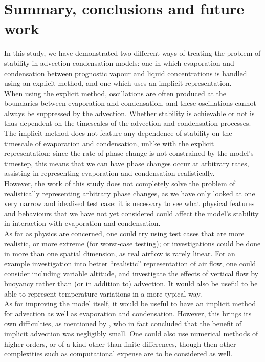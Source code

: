 \documentclass[11pt]{article}
\begin{document}
\section{Summary, conclusions and future work}
In this study, we have demonstrated two different ways of treating the problem of stability in advection-condensation models: one in which evaporation and condensation between prognostic vapour and liquid concentrations is handled using an explicit method, and one which uses an implicit representation. \\
When using the explicit method, oscillations are often produced at the boundaries between evaporation and condensation, and these oscillations cannot always be suppressed by the advection. Whether stability is achievable or not is thus dependent on the timescales of the advection and condensation processes. \\
The implicit method does not feature any dependence of stability on the timescale of evaporation and condensation, unlike with the explicit representation: since the rate of phase change is not constrained by the model's timestep, this means that we can have phase changes occur at arbitrary rates, assisting in representing evaporation and condensation realistically. \\
However, the work of this study does not completely solve the problem of realistically representing arbitrary phase changes, as we have only looked at one very narrow and idealised test case: it is necessary to see what physical features and behaviours that we have not yet considered could affect the model's stability in interaction with evaporation and condensation. \\
As far as physics are concerned, one could try using test cases that are more realistic, or more extreme (for worst-case testing); or investigations could be done in more than one spatial dimension, as real airflow is rarely linear. For an example investigation into better ``realistic'' representation of air flow, one could consider including variable altitude, and investigate the effects of vertical flow by buoyancy rather than (or in addition to) advection. It would also be useful to be able to represent temperature variations in a more typical way. \\
As for improving the model itself, it would be useful to have an implicit method for advection as well as evaporation and condensation. However, this brings its own difficulties, as mentioned by \citet{GS1990}, who in fact concluded that the benefit of implicit advection was negligibly small. One could also use numerical methods of higher orders, or of a kind other than finite differences, though then other complexities such as computational expense are to be considered as well.

\newpage


\end{document}
